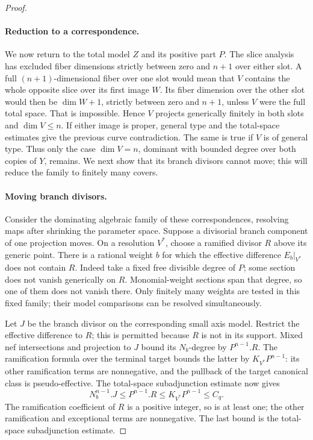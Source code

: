 \begin{proof}
\paragraph{Reduction to a correspondence.}
We now return to the total model \(Z\) and its positive part \(P\).
The slice analysis has excluded fiber dimensions strictly between
zero and \(n+1\) over either slot.  A full \((n+1)\)-dimensional fiber over
one slot would mean that \(V\) contains the whole opposite slice
over its first image \(W\).  Its fiber dimension over the other
slot would then be \(\dim W+1\), strictly between zero and \(n+1\),
unless \(V\) were the full total space.  That is impossible.
Hence \(V\) projects generically finitely in both slots and
\(\dim V\le n\).  If either image is proper, general type and the
total-space estimates give the previous curve contradiction.
The same is true if \(V\) is of general type.
Thus only the case \(\dim V=n\), dominant with bounded degree over both
copies of \(Y\), remains.  We next show that its branch divisors
cannot move; this will reduce the family to finitely many covers.

\paragraph{Moving branch divisors.}
Consider the dominating algebraic family of these correspondences,
resolving maps after shrinking the parameter space.  Suppose a
divisorial branch component of one projection moves.  On a
resolution \(V^*\), choose a ramified divisor \(R\) above its generic
point.  There is a rational weight \(b\) for which the effective
difference \(E_b|_{V^*}\) does not contain \(R\).
Indeed take a fixed free divisible degree of \(P\); some section
does not vanish generically on \(R\).  Monomial-weight sections
span that degree, so one of them does not vanish there.
Only finitely many weights are tested in this fixed family; their
model comparisons can be resolved simultaneously.

Let \(J\) be the branch divisor on the corresponding small axis
model. Restrict the effective difference to \(R\); this is permitted
because \(R\) is not in its support. Mixed nef intersections and
projection to \(J\) bound its \(N_b\)-degree by \(P^{n-1}.R\).
The ramification formula over the terminal target bounds the latter
by \(K_{V^*}P^{n-1}\): its other ramification terms are nonnegative,
and the pullback of the target canonical class is pseudo-effective.
The total-space subadjunction estimate now gives
\begin{equation}\label{jet:branch-degree}
 N_b^{n-1}.J\le P^{n-1}.R
 \le K_{V^*}P^{n-1}\le C_q.
\end{equation}
The ramification coefficient of \(R\) is a positive integer, so is
at least one; the other ramification and exceptional terms are
nonnegative.  The last bound is the total-space subadjunction
estimate.


\end{proof}

